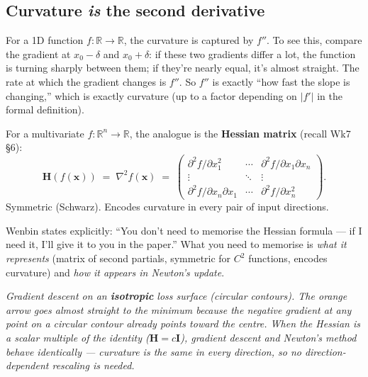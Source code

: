 \documentclass[11pt, a4paper]{article}
\begin{document}
\subsection{Curvature \emph{is} the second derivative}

For a 1D function $f:\mathbb{R}\to\mathbb{R}$, the curvature is captured by $f''$. To see this, compare the gradient at $x_0 - \delta$ and $x_0 + \delta$: if these two gradients differ a lot, the function is turning sharply between them; if they're nearly equal, it's almost straight. The rate at which the gradient changes is $f''$. So $f''$ is exactly ``how fast the slope is changing,'' which is exactly curvature (up to a factor depending on $|f'|$ in the formal definition).

For a multivariate $f:\mathbb{R}^n\to\mathbb{R}$, the analogue is the \textbf{Hessian matrix} (recall Wk7 §6):
\[
\mathbf{H}(f(\mathbf{x})) \;=\; \nabla^2 f(\mathbf{x}) \;=\;
\begin{pmatrix}
\partial^2 f/\partial x_1^2 & \cdots & \partial^2 f/\partial x_1 \partial x_n \\
\vdots & \ddots & \vdots \\
\partial^2 f/\partial x_n \partial x_1 & \cdots & \partial^2 f/\partial x_n^2
\end{pmatrix}.
\]
Symmetric (Schwarz). Encodes curvature in every pair of input directions.

\begin{notebox}
Wenbin states explicitly: ``You don't need to memorise the Hessian formula — if I need it, I'll give it to you in the paper.'' What you need to memorise is \emph{what it represents} (matrix of second partials, symmetric for $C^2$ functions, encodes curvature) and \emph{how it appears in Newton's update}.
\end{notebox}

\begin{center}

\footnotesize\textit{Gradient descent on an \textbf{isotropic} loss surface (circular contours). The orange arrow goes almost straight to the minimum because the negative gradient at any point on a circular contour already points toward the centre. When the Hessian is a scalar multiple of the identity ($\mathbf{H} = c\mathbf{I}$), gradient descent and Newton's method behave identically --- curvature is the same in every direction, so no direction-dependent rescaling is needed.}
\end{center}
\end{document}
